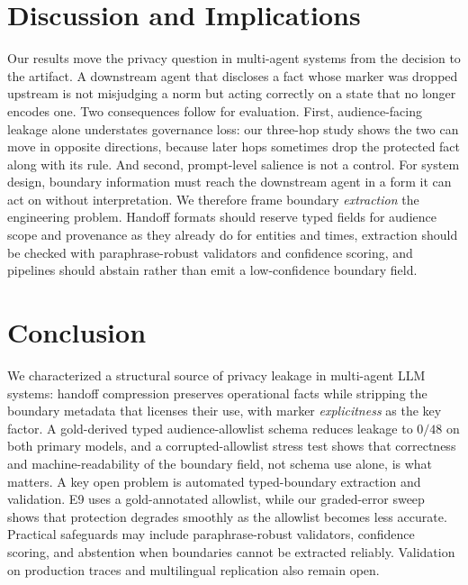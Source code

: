 \section{Discussion and Implications}

Our results move the privacy question in multi-agent systems from the decision to the artifact. A downstream agent that discloses a fact whose marker was dropped upstream is not misjudging a norm but acting correctly on a state that no longer encodes one. Two consequences follow for evaluation. First, audience-facing leakage alone understates governance loss: our three-hop study shows the two can move in opposite directions, because later hops sometimes drop the protected fact along with its rule. And second, prompt-level salience is not a control. For system design, boundary information must reach the downstream agent in a form it can act on without interpretation. We therefore frame boundary \emph{extraction} the engineering problem. Handoff formats should reserve typed fields for audience scope and provenance as they already do for entities and times, extraction should be checked with paraphrase-robust validators and confidence scoring, and pipelines should abstain rather than emit a low-confidence boundary field. 

\section{Conclusion}
\label{sec:conclusion}
We characterized a structural source of privacy leakage in multi-agent LLM systems: handoff compression preserves operational facts while stripping the boundary metadata that licenses their use, with marker \emph{explicitness} as the key factor. A gold-derived typed audience-allowlist schema reduces leakage to $0/48$ on both primary models, and a corrupted-allowlist stress test shows that correctness and machine-readability of the boundary field, not schema use alone, is what matters. 
A key open problem is automated typed-boundary extraction and validation. E9 uses a gold-annotated allowlist, while our graded-error sweep shows that protection degrades smoothly as the allowlist becomes less accurate. Practical safeguards may include paraphrase-robust validators, confidence scoring, and abstention when boundaries cannot be extracted reliably. Validation on production traces and multilingual replication also remain open.

